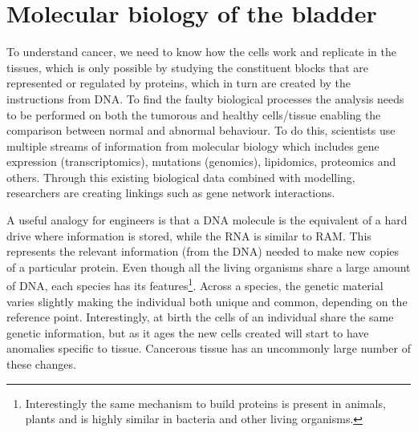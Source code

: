 
\section{Molecular biology of the bladder}


To understand cancer, we need to know how the cells work and replicate in the tissues, which is only possible by studying the constituent blocks that are represented or regulated by proteins, which in turn are created by the instructions from DNA. To find the faulty biological processes the analysis needs to be performed on both the tumorous and healthy cells/tissue enabling the comparison between normal and abnormal behaviour. To do this, scientists use multiple streams of information from molecular biology which includes gene expression (transcriptomics), mutations (genomics), lipidomics, proteomics and others. Through this existing biological data combined with modelling, researchers are creating linkings such as gene network interactions. 

A useful analogy for engineers is that a DNA molecule is the equivalent of a hard drive where information is stored, while the RNA is similar to RAM. This represents the relevant information (from the DNA) needed to make new copies of a particular protein. Even though all the living organisms share a large amount of DNA, each species has its features\footnote{Interestingly the same mechanism to build proteins is present in animals, plants and is highly similar in bacteria and other living organisms.}. Across a species, the genetic material varies slightly making the individual both unique and common, depending on the reference point. Interestingly, at birth the cells of an individual share the same genetic information, but as it ages the new cells created will start to have anomalies specific to tissue. Cancerous tissue has an uncommonly large number of these changes.

